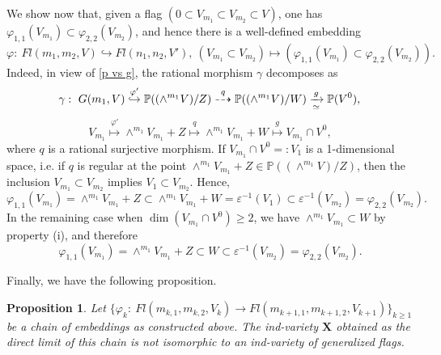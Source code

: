 \documentclass[12pt]{amsart}
\renewcommand{\phi}{\varphi}
\newtheorem{proposition}[theorem]{Proposition}
\theoremstyle{definition}
\begin{document}
We show now that, given a flag $(0\subset V_{m_1}\subset 
V_{m_2}\subset V)$, one has 
$\varphi_{1,1}(V_{m_1})\subset\varphi_{2,2}(V_{m_2})$, and 
hence there is a well-defined embedding 
$$\varphi:\ Fl(m_1,m_2,V)\hookrightarrow Fl(n_1,n_2,V'),\ 
(V_{m_1}\subset V_{m_2})\mapsto(\varphi_{1,1}(V_{m_1})\subset
\varphi_{2,2}(V_{m_2})).
$$ 
Indeed, in view of \eqref{p vs g}, the rational morphism 
$\gamma$ decomposes as
$$
\gamma:\ G(m_1,V)\overset{\phi'}{\hookrightarrow}\mathbb{P}
((\wedge^{m_1}V)/Z)\overset{q}{\dasharrow}\mathbb{P}(
(\wedge^{m_1}V)/W)\xrightarrow[\simeq]{g}\mathbb{P}(V^0),\\
$$
$$
V_{m_1}\overset{\phi'}{\mapsto}\wedge^{m_1}V_{m_1}+Z\overset
{q}{\mapsto}\wedge^{m_1}V_{m_1}+W\overset{g}
{\mapsto} V_{m_1}\cap V^0, 
$$
where $q$ is a rational surjective morphism. If 
$V_{m_1}\cap V^0=:V_1$ is a 1-dimensional space, 
i.e. if $q$ is regular at the point $\wedge^{m_1}V_{m_1}+Z
\in\mathbb{P}((\wedge^{m_1}V)/Z)$, then the inclusion 
$V_{m_1}\subset V_{m_2}$ implies $V_1\subset 
V_{m_2}$. Hence, $$\phi_{1,1}(V_{m_1})=\wedge^{m_1}V_{m_1}+Z
\subset\wedge^{m_1}V_{m_1}+W=\varepsilon^{-1}(V_1)\subset 
\varepsilon^{-1}(V_{m_2})=\phi_{2,2}(V_{m_2}).$$ In the 
remaining case when $\dim(V_{m_1}\cap V^0)\ge2$, we have 
$\wedge^{m_1}V_{m_1}\subset W$ by property (i), and therefore
$$\phi_{1,1}(V_{m_1})=\wedge^{m_1}V_{m_1}+Z\subset W\subset 
\varepsilon^{-1}(V_{m_2})=\phi_{2,2}(V_{m_2}).$$

Finally, we have the following proposition.
\begin{proposition}
Let $\{\phi_k:\ Fl(m_{k,1},m_{k,2},V_k)\to Fl(m_{k+1,1},m_{k+1,
2},V_{k+1})\}_{k\ge1}$ be a chain of embeddings as constructed 
above. The ind-variety $\mathbf{X}$ obtained as the direct 
limit of this chain is not isomorphic to an ind-variety of 
generalized flags.
\end{proposition}
\end{document}
